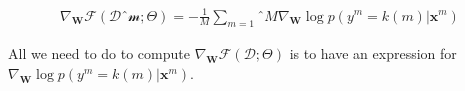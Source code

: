 \begin{align}
\nabla_\mathbf{W}\mathcal{F}(\mathcal{Dˆm};\Theta) = - \frac{1}{M} \sum_{m=1}ˆM \nabla_\mathbf{W} \log p(y^m=k(m) | \mathbf{x}^m)
\label{eq:GradientCostDecomposition}
\end{align}

All we need to do to compute $\nabla_\mathbf{W}\mathcal{F}(\mathcal{D};\Theta)$  is to have an expression for $\nabla_\mathbf{W} \log p(y^m=k(m) | \mathbf{x}^m)$.


